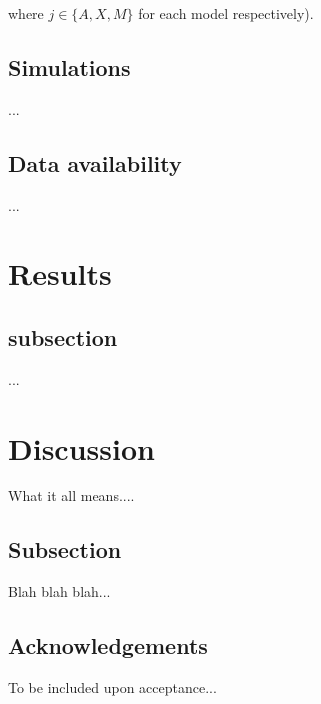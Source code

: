 \documentclass{article}
\begin{document}
\noindent where $j \in \{A,X,M\}$ for each model respectively).
\subsection{Simulations} \label{subsec:simulations}

...



\subsection*{Data availability}
...

\section*{Results}

\subsection*{subsection}

...


\section*{Discussion}

What it all means....

\subsection*{Subsection}

Blah blah blah...


\subsection*{Acknowledgements}
To be included upon acceptance...
\end{document}
